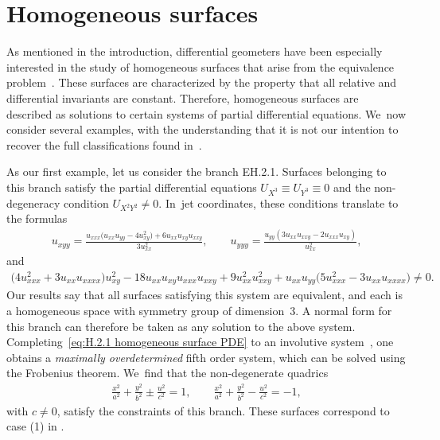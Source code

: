 \documentclass[pdftex]{sigma}%
\numberwithin{equation}{section}
\begin{document}
\section{Homogeneous surfaces}\label{sec:homogeneous surfaces}

As mentioned in the introduction, differential geometers have been especially interested in the study of homogeneous surfaces that arise from the equivalence problem~\cite{ADV-1997,DKR-1996,EE-1999}. These surfaces are characterized by the property that all relative and differential invariants are constant. Therefore, homogeneous surfaces are described as solutions to certain systems of partial differential equations. We~now consider several examples, with the understanding that it is not our intention to recover the full classifications found in~\cite{ADV-1997,DKR-1996,EE-1999}.

\begin{Example}%
As our first example, let us consider the branch EH.2.1. Surfaces belonging to this branch satisfy the partial differential equations $U_{X^3}\equiv U_{Y^3} \equiv 0$ and the non-degeneracy condition $U_{X^2Y^2}\neq 0$. In~jet coordinates, these conditions translate to the formulas
%
\begin{gather}\label{eq:H.2.1 homogeneous surface PDE}
u_ {xyy}=\frac{u_{xxx} \big(u_{xx} u_{yy}-4 u_ {xy}^2\big)+6 u_{xx} u_{xy}u_{xxy}}{3 u_ {xx}^2},\qquad
u_ {yyy}=\frac{u_{yy} (3 u_{xx} u_{xxy}-2u_{xxx} u_{xy})}{u_ {xx}^2},
\end{gather}
%
and
\begin{gather*}
\big(4 u_{xxx}^2\!+3 u_{xx} u_{xxxx}\big) u_{xy}^2-18 u_{xx} u_{xy} u_{xxx}u_{xxy} \!+9 u_{xx}^2 u_{xxy}^2\!+u_{xx}u_{yy}\big(5 u_{xxx}^2\!-3 u_{xx}u_{xxxx}\big) \neq0.
\end{gather*}
Our results say that all surfaces satisfying this system are equivalent, and each is a homogeneous space with symmetry group of dimension~3. A normal form for this branch can therefore be taken as any solution to the above system. Completing~\eqref{eq:H.2.1 homogeneous surface PDE} to an involutive system~\cite{S-2010}, one obtains a \emph{maximally overdetermined} fifth order system, which can be solved using the Frobenius theorem. We~find that the non-degenerate quadrics
\begin{gather*}
\frac{x^2}{a^2}+\frac{y^2}{b^2}\pm \frac{u^2}{c^2}=1,\qquad
\frac{x^2}{a^2}+\frac{y^2}{b^2}-\frac{u^2}{c^2}=-1,
\end{gather*}
with $c\neq 0$, satisfy the constraints of this branch. These surfaces correspond to case (1) in \cite[Theorem 1.1]{ADV-1997}.
\end{Example}
\end{document}
